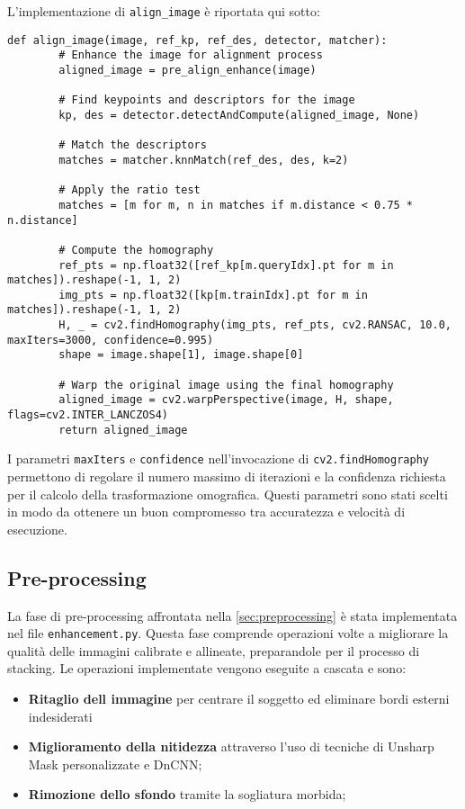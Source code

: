 L'implementazione di \texttt{align\_image} è riportata qui sotto:

\begin{lstlisting}[label={lst:single_alignment}]
    def align_image(image, ref_kp, ref_des, detector, matcher):
        # Enhance the image for alignment process
        aligned_image = pre_align_enhance(image)

        # Find keypoints and descriptors for the image
        kp, des = detector.detectAndCompute(aligned_image, None)

        # Match the descriptors
        matches = matcher.knnMatch(ref_des, des, k=2)
        
        # Apply the ratio test
        matches = [m for m, n in matches if m.distance < 0.75 * n.distance]
        
        # Compute the homography
        ref_pts = np.float32([ref_kp[m.queryIdx].pt for m in matches]).reshape(-1, 1, 2)
        img_pts = np.float32([kp[m.trainIdx].pt for m in matches]).reshape(-1, 1, 2)
        H, _ = cv2.findHomography(img_pts, ref_pts, cv2.RANSAC, 10.0, maxIters=3000, confidence=0.995)
        shape = image.shape[1], image.shape[0]
        
        # Warp the original image using the final homography
        aligned_image = cv2.warpPerspective(image, H, shape, flags=cv2.INTER_LANCZOS4)
        return aligned_image
\end{lstlisting}

I parametri \texttt{maxIters} e \texttt{confidence} nell'invocazione di \texttt{cv2.findHomography} permettono di regolare il numero massimo di iterazioni e la confidenza richiesta per il calcolo della trasformazione omografica. Questi parametri sono stati scelti in modo da ottenere un buon compromesso tra accuratezza e velocità di esecuzione.

\subsection{Pre-processing} \label{subsec:preprocessing_impl}

La fase di pre-processing affrontata nella \cref{sec:preprocessing} è stata implementata nel file \texttt{enhancement.py}. Questa fase comprende operazioni volte a migliorare la qualità delle immagini calibrate e allineate, preparandole per il processo di stacking. Le operazioni implementate vengono eseguite a cascata e sono:

\begin{itemize}
    \item \textbf{Ritaglio dell immagine} per centrare il soggetto ed eliminare bordi esterni indesiderati
    \item \textbf{Miglioramento della nitidezza} attraverso l'uso di tecniche di Unsharp Mask personalizzate e DnCNN;
    \item \textbf{Rimozione dello sfondo} tramite la sogliatura morbida;
\end{itemize}

